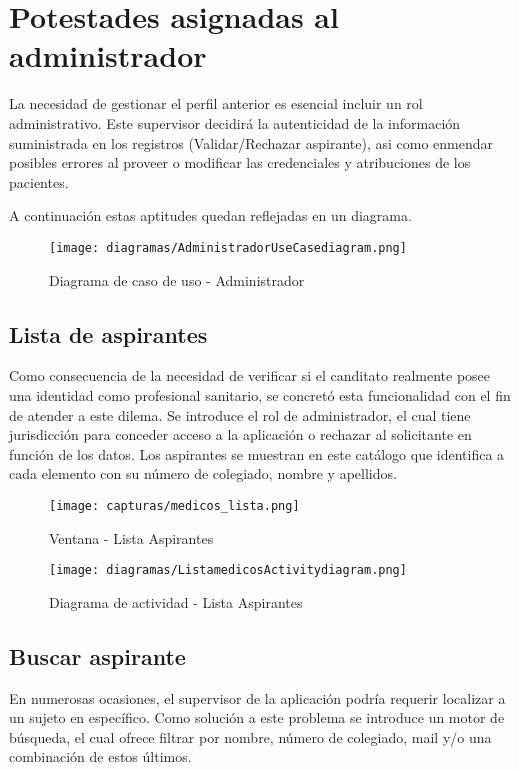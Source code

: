 \documentclass[11pt,spanish,
		listoftables,listoffigures]
		{tfgplantilla}
\begin{document}
\vfill
\section {Potestades asignadas al administrador}
La necesidad de gestionar el perfil anterior es esencial incluir un rol administrativo. Este supervisor decidirá la autenticidad de la información suministrada en los registros (Validar/Rechazar aspirante), asi como enmendar posibles errores al proveer o modificar las credenciales y atribuciones de los pacientes.

A continuación estas aptitudes quedan reflejadas en un diagrama.

\vskip 1.5cm
\begin{figure}[H]
\centering
\texttt{[image: diagramas/AdministradorUseCasediagram.png]}
\caption{Diagrama de caso de uso - Administrador}
\end{figure}

\vfill
\subsection {Lista de aspirantes}

Como consecuencia de la necesidad de verificar si el canditato realmente posee una identidad como profesional sanitario, se concretó esta funcionalidad con el fin de atender a este dilema. Se introduce el rol de administrador, el cual tiene jurisdicción para conceder acceso a la aplicación o rechazar al solicitante en función de los datos. Los aspirantes se muestran en este catálogo que identifica a cada elemento con su número de colegiado, nombre y apellidos.

\begin{figure}[H]
\centering
\texttt{[image: capturas/medicos\_lista.png]}
\caption{Ventana -  Lista Aspirantes}
\end{figure}

\begin{figure}[H]
\centering
\texttt{[image: diagramas/ListamedicosActivitydiagram.png]}
\caption{Diagrama de actividad -  Lista Aspirantes}
\end{figure}

\vfill
\subsection {Buscar aspirante}

En numerosas ocasiones, el supervisor de la aplicación podría requerir localizar a un sujeto en específico. Como solución a este problema se introduce un motor de búsqueda, el cual ofrece filtrar por nombre, número de colegiado, mail y/o una combinación de estos últimos.
\end{document}

